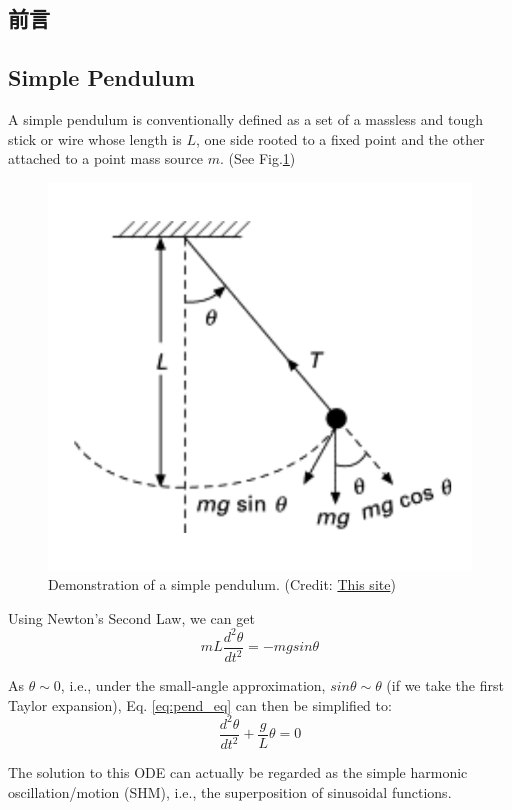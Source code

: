 \documentclass[12pt,a4paper]{article}
\begin{document}
\begin{CJK}{UTF8}{bkai}
\section{前言}

\subsection{Simple Pendulum}
\hfill

A simple pendulum is conventionally defined as a set of a massless and tough stick or wire whose length is $L$, one side rooted to a fixed point and the other attached to a point mass source $m$. (See Fig.\ref{fig:simple_pendulum})

\begin{figure}[h]
    \centering
    \includegraphics[width=0.5\linewidth]{simple_pendulum.png}
    \caption{Demonstration of a simple pendulum. (Credit: \href{https://www.sciencedirect.com/topics/engineering/simple-pendulum}{This site})}
    \label{fig:simple_pendulum}
\end{figure}

Using Newton's Second Law, we can get 
\begin{equation}\label{eq:pend_eq}
    mL\frac{d^2\theta}{dt^2}=-mgsin\theta
\end{equation}

As $\theta\sim0$, i.e., under the small-angle approximation, $sin\theta\sim\theta$ (if we take the first Taylor expansion), Eq. \ref{eq:pend_eq} can then be simplified to:
\begin{equation}
    \frac{d^2\theta}{dt^2}+\frac{g}{L}\theta=0
\end{equation}

The solution to this ODE can actually be regarded as the simple harmonic oscillation/motion (SHM), i.e., the superposition of sinusoidal functions.


\end{CJK}
\end{document}
